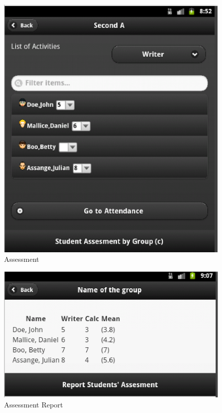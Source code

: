 \begin{figure}
    \begin{center}
        \includegraphics{eduxes_students_assessment01.eps}
        \caption{Assessment}
        \label{fig:EduXesAssessment}
    \end{center}
\end{figure}



\begin{figure}
    \begin{center}
        \includegraphics{eduxes_assessment1.eps}
        \caption{ Assessment Report}
        \label{fig:EduXesAssessmentReport}
    \end{center}
\end{figure}


